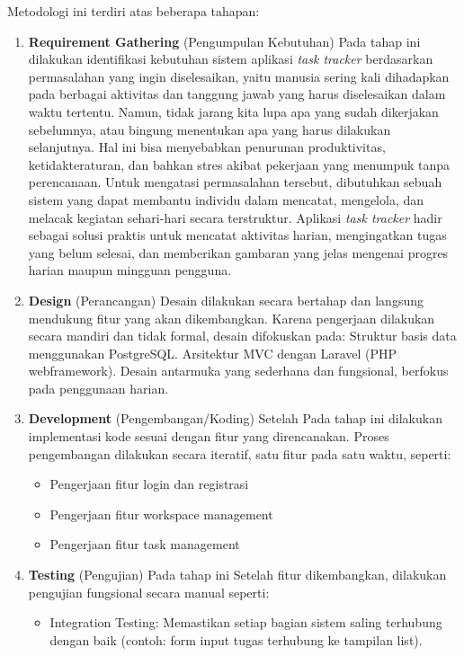 Metodologi ini terdiri atas beberapa tahapan:
\begin{enumerate}
    \item \textbf{Requirement Gathering} (Pengumpulan Kebutuhan)
    \newline Pada tahap ini dilakukan identifikasi kebutuhan sistem aplikasi \textit{task tracker} berdasarkan permasalahan yang ingin diselesaikan, yaitu manusia sering kali dihadapkan pada berbagai aktivitas dan tanggung jawab yang harus diselesaikan dalam waktu tertentu. 
    Namun, tidak jarang kita lupa apa yang sudah dikerjakan sebelumnya, atau bingung menentukan apa yang harus dilakukan selanjutnya. 
    Hal ini bisa menyebabkan penurunan produktivitas, ketidakteraturan, dan bahkan stres akibat pekerjaan yang menumpuk tanpa perencanaan.
    \newline Untuk mengatasi permasalahan tersebut, dibutuhkan sebuah sistem yang dapat membantu individu dalam mencatat, mengelola, dan melacak kegiatan sehari-hari secara terstruktur.
    Aplikasi \textit{task tracker} hadir sebagai solusi praktis untuk mencatat aktivitas harian, mengingatkan tugas yang belum selesai, dan memberikan gambaran yang jelas mengenai progres harian maupun mingguan pengguna.
    \item \textbf{Design} (Perancangan)
    Desain dilakukan secara bertahap dan langsung mendukung fitur yang akan dikembangkan. Karena pengerjaan dilakukan secara mandiri dan tidak formal, desain difokuskan pada: Struktur basis data menggunakan PostgreSQL. Arsitektur MVC dengan Laravel (PHP webframework). 
    Desain antarmuka yang sederhana dan fungsional, berfokus pada penggunaan harian.
    \item \textbf{Development} (Pengembangan/Koding)
    Setelah Pada tahap ini dilakukan implementasi kode sesuai dengan fitur yang direncanakan.
    Proses pengembangan dilakukan secara iteratif, satu fitur pada satu waktu, seperti:
    \begin{itemize}
        \item Pengerjaan fitur login dan registrasi
        \item Pengerjaan fitur workspace management
        \item Pengerjaan fitur task management
    \end{itemize}
    \item \textbf{Testing} (Pengujian)
    Pada tahap ini Setelah fitur dikembangkan, dilakukan pengujian fungsional secara manual seperti: 
    \begin{itemize}
        \item Integration Testing: Memastikan setiap bagian sistem saling terhubung dengan baik (contoh: form input tugas terhubung ke tampilan list).

\end{itemize}
\end{enumerate}
